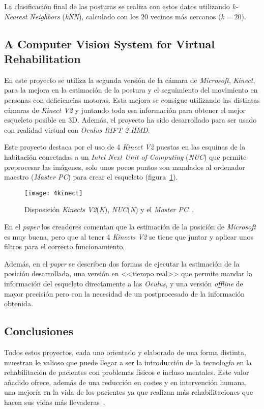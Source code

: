 La clasificación final de las posturas se realiza con estos datos utilizando \textit{k-Nearest Neighbors} (\textit{kNN}), calculado con los 20 vecinos más cercanos ($k=20$).

\subsection{A Computer Vision System for Virtual Rehabilitation~\cite{bonen}}
En este proyecto se utiliza la segunda versión de la cámara de \textit{Microsoft}, \textit{Kinect}, para la mejora en la estimación de la postura y el seguimiento del movimiento en personas con deficiencias motoras. Esta mejora se consigue utilizando las distintas cámaras de \textit{Kinect V2} y juntando toda esa información para obtener el mejor esqueleto posible en 3D. Además, el proyecto ha sido desarrollado para ser usado con realidad virtual con \textit{Oculus RIFT 2 HMD}.

Este proyecto destaca por el uso de 4 \textit{Kinect V2} puestas en las esquinas de la habitación conectadas a un \textit{Intel Next Unit of Computing} (\textit{NUC}) que permite preprocesar las imágenes, solo unos pocos puntos son mandados al ordenador maestro (\textit{Master PC}) para crear el esqueleto (figura~\ref{fig:4kinects}).

\begin{figure}[h]
	\centering
	\texttt{[image: 4kinect]}
	\caption[Disposición \textit{Kinects V2}(\textit{K}), \textit{NUC}(\textit{N}) y el \textit{Master PC}.]{Disposición \textit{Kinects V2}(\textit{K}), \textit{NUC}(\textit{N}) y el \textit{Master PC}~\cite{bonen}.}
	\label{fig:4kinects}
\end{figure}

En el \textit{paper} los creadores comentan que la estimación de la posición de \textit{Microsoft} es muy buena, pero que al tener 4 \textit{Kinects V2} se tiene que juntar y aplicar unos filtros para el correcto funcionamiento.

Además, en el \textit{paper} se describen dos formas de ejecutar la estimación de la posición desarrollada, una versión en <<tiempo real>> que permite mandar la información del esqueleto directamente a las \textit{Oculus}, y una versión \textit{offline} de mayor precisión pero con la necesidad de un postprocesado de la información obtenida.


\subsection{Conclusiones}
Todos estos proyectos, cada uno orientado y elaborado de una forma distinta, muestran lo valioso que puede llegar a ser la introducción de la tecnología en la rehabilitación de pacientes con problemas físicos e incluso mentales. Este valor añadido ofrece, además de una reducción en costes y en intervención humana, una mejoría en la vida de los pacientes ya que realizan más rehabilitaciones que hacen sus vidas más llevaderas~\cite{motiv}.
